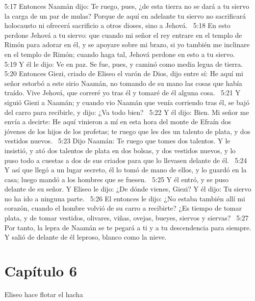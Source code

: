 5:17 Entonces Naamán dijo: Te ruego, pues, ¿de esta tierra no se dará a tu siervo la carga de un par de mulas? Porque de aquí en adelante tu siervo no sacrificará holocausto ni ofrecerá sacrificio a otros dioses, sino a Jehová.  
5:18 En esto perdone Jehová a tu siervo: que cuando mi señor el rey entrare en el templo de Rimón para adorar en él, y se apoyare sobre mi brazo, si yo también me inclinare en el templo de Rimón; cuando haga tal, Jehová perdone en esto a tu siervo.  
5:19 Y él le dijo: Ve en paz. Se fue, pues, y caminó como media legua de tierra.  
5:20 Entonces Giezi, criado de Eliseo el varón de Dios, dijo entre sí: He aquí mi señor estorbó a este sirio Naamán, no tomando de su mano las cosas que había traído. Vive Jehová, que correré yo tras él y tomaré de él alguna cosa.  
5:21 Y siguió Giezi a Naamán; y cuando vio Naamán que venía corriendo tras él, se bajó del carro para recibirle, y dijo: ¿Va todo bien?  
5:22 Y él dijo: Bien. Mi señor me envía a decirte: He aquí vinieron a mí en esta hora del monte de Efraín dos jóvenes de los hijos de los profetas; te ruego que les des un talento de plata, y dos vestidos nuevos.  
5:23 Dijo Naamán: Te ruego que tomes dos talentos. Y le insistió, y ató dos talentos de plata en dos bolsas, y dos vestidos nuevos, y lo puso todo a cuestas a dos de sus criados para que lo llevasen delante de él.  
5:24 Y así que llegó a un lugar secreto, él lo tomó de mano de ellos, y lo guardó en la casa; luego mandó a los hombres que se fuesen.  
5:25 Y él entró, y se puso delante de su señor. Y Eliseo le dijo: ¿De dónde vienes, Giezi? Y él dijo: Tu siervo no ha ido a ninguna parte.  
5:26 El entonces le dijo: ¿No estaba también allí mi corazón, cuando el hombre volvió de su carro a recibirte? ¿Es tiempo de tomar plata, y de tomar vestidos, olivares, viñas, ovejas, bueyes, siervos y siervas?  
5:27 Por tanto, la lepra de Naamán se te pegará a ti y a tu descendencia para siempre. Y salió de delante de él leproso, blanco como la nieve.  
\section*{Capítulo 6 }
Eliseo hace flotar el hacha  

